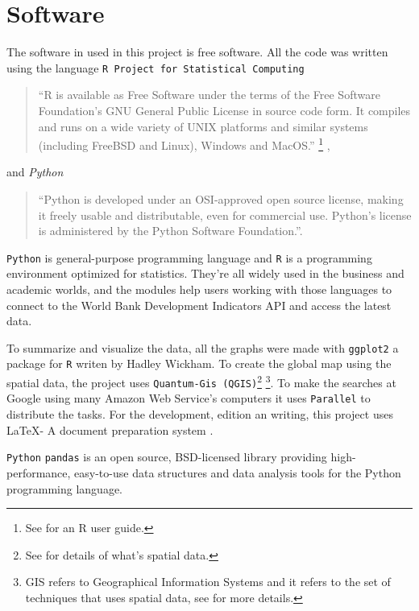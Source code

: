 \chapter{Software}
\label{chap_software}


\noindent The software in used in this project is free software. All the code was written using the  language \texttt{R Project for Statistical Computing}\begin{quote}``R is available as Free Software under the terms of the Free Software Foundation’s GNU General Public License in source code form. It compiles and runs on a wide variety of UNIX platforms and similar systems (including FreeBSD and Linux), Windows and MacOS.'' \footnote{See \cite{R:Bloomfield:2014} for an R user guide.} \cite{r_pagina},\end{quote}
and \textit{Python}
\begin{quote}``Python is developed under an OSI-approved open source license, making it freely usable and distributable, even for commercial use. Python's license is administered by the Python Software Foundation.''\cite{python_about}.\end{quote}

\texttt{Python} is general-purpose programming language and \texttt{R} is  a programming environment optimized for statistics. They're all widely used in the business and academic worlds, and the modules help users working with those languages to connect to the World Bank Development Indicators API and access the latest data.

To summarize and visualize the data, all the graphs were made with \texttt{ggplot2} \parencite{wickham_ggplot} a package for \texttt{R} writen by Hadley Wickham. To create the global map using the spatial data, the project uses \texttt{Quantum-Gis (QGIS)}\footnote{See \cite{clifford1981} for details of what's spatial data.} \footnote{GIS refers to Geographical Information Systems and it refers to the set of techniques that uses spatial data, see \cite{GIS05}  for more details.}. To make the searches at Google using many Amazon Web Service's computers it uses \texttt{Parallel} \parencite{Tange2011a} to distribute the tasks. For the development, edition an writing, this project uses \LaTeX - A document preparation system \cite{latex}.

\texttt{Python} \texttt{pandas} is an open source, BSD-licensed library providing high-performance, easy-to-use data structures and data analysis tools for the Python programming language.